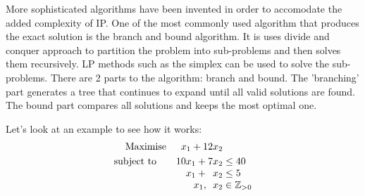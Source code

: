 \documentclass[a4paper, 12pt]{report}
\begin{document}
More sophisticated algorithms have been invented in order to accomodate the added complexity of IP. One of the most commonly
used algorithm that produces the exact solution is the branch and bound algorithm. It is uses divide and
conquer approach to partition the problem into sub-problems
and then solves them recursively. LP methods such as the simplex can be used to solve the sub-problems.
There are 2 parts to the algorithm: branch and bound. The 'branching' part generates a tree
that continues to expand until all valid solutions are found. The bound part compares all solutions and keeps the
most optimal one.

Let's look at an example to see how it works:
\[
  \begin{array}{r@{}r@{}l}
    \text{Maximise} \quad &{}x_{1} + 12x_{2} \\[\jot]
    \text{subject to}\qquad &{}10x_{1} +   7x_{2} &{} \leq 40 \\
    \qquad &{} x_{1} +   \phantom{2}x_{2} &{} \leq 5 \\
    \qquad &{} x_{1} ,   \phantom{2}x_{2} &{} \in \mathbb{Z}_{>0}\\
  \end{array}
\]
\end{document}
